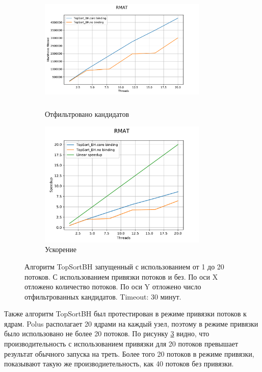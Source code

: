 \documentclass[12pt,a4paper,oneside,openany]{article}
\theoremstyle{definition}
\theoremstyle{lemma}
\theoremstyle{remark}
\begin{document}
\begin{figure}[H]
    \begin{subfigure}{.5\textwidth}
        \centering
        \includegraphics[width=8cm,height=6cm]{images/18_threads_RMAT.pdf}
        \caption{Отфильтровано кандидатов}
        \label{subfig:corebinding:speedup}
    \end{subfigure}
    \begin{subfigure}{.5\textwidth}
        \centering
        \includegraphics[width=8cm]{images/18_threads_RMAT_speedup.pdf}
        \caption{Ускорение}
        \label{subfig:corebinding:speedup}
    \end{subfigure}
    \caption{Алгоритм TopSortBH запущенный с использованием от 1 до 20 потоков. С использованием привязки потоков и без. По оси X отложено количество потоков. По оси Y отложено число отфильтрованных кандидатов. Timeout: 30 минут.}
    \label{fig:corebinding}
\end{figure}

Также алгоритм TopSortBH был протестирован в режиме привязки потоков к ядрам.
Polus располагает 20 ядрами на каждый узел, поэтому в режиме привязки было использовано не более 20 потоков.
По рисунку \ref{fig:corebinding} видно, что производительность с использованием
привязки для 20 потоков превышает результат обычного запуска на треть.
Более того 20 потоков в режиме привязки, показывают такую же производиетельность, как 40 потоков
без привязки.
\end{document}
